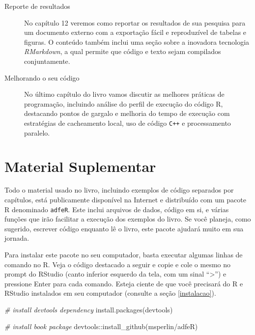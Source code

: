 \documentclass[
  11pt,
]{book}
\newenvironment{Shaded}{\begin{snugshade}}{\end{snugshade}}
\newcommand{\CommentTok}[1]{\textcolor[rgb]{0.37,0.37,0.37}{\textit{#1}}}
\newcommand{\FunctionTok}[1]{\textcolor[rgb]{0,0,0}{#1}}
\newcommand{\NormalTok}[1]{#1}
\newcommand{\SpecialCharTok}[1]{\textcolor[rgb]{0,0,0}{#1}}
\newcommand{\StringTok}[1]{\textcolor[rgb]{0.5,0.5,0.5}{#1}}
\begin{document}
\begin{description}
\item[Reporte de resultados]
No capítulo 12 veremos como reportar os resultados de sua pesquisa para um documento externo com a exportação fácil e reproduzível de tabelas e figuras. O conteúdo também inclui uma seção sobre a inovadora tecnologia \emph{RMarkdown}, a qual permite que código e texto sejam compilados conjuntamente.
\item[Melhorando o seu código]
No último capítulo do livro vamos discutir as melhores práticas de programação, incluindo análise do perfil de execução do código R, destacando pontos de gargalo e melhoria do tempo de execução com estratégias de cacheamento local, uso de código \texttt{C++} e processamento paralelo.
\end{description}

\hypertarget{material-suplementar}{%
\section*{Material Suplementar}\label{material-suplementar}}

Todo o material usado no livro, incluindo exemplos de código separados por capítulos, está publicamente disponível na Internet e distribuído com um pacote R denominado \texttt{adfeR}. Este inclui arquivos de dados, código em si, e várias funções que irão facilitar a execução dos exemplos do livro. Se você planeja, como sugerido, escrever código enquanto lê o livro, este pacote ajudará muito em sua jornada.

Para instalar este pacote no seu computador, basta executar algumas linhas de comando no R. Veja o código destacado a seguir e copie e cole o mesmo no prompt do RStudio (canto inferior esquerdo da tela, com um sinal ``\textgreater{}'') e pressione Enter para cada comando. Esteja ciente de que você precisará do R e RStudio instalados em seu computador (consulte a seção \ref{instalacao}).

\begin{Shaded}
\begin{Highlighting}[]
\CommentTok{\# install devtools dependency}
\FunctionTok{install.packages}\NormalTok{(}\StringTok{\textquotesingle{}devtools\textquotesingle{}}\NormalTok{)}

\CommentTok{\# install book package}
\NormalTok{devtools}\SpecialCharTok{::}\FunctionTok{install\_github}\NormalTok{(}\StringTok{\textquotesingle{}msperlin/adfeR\textquotesingle{}}\NormalTok{)}
\end{Highlighting}
\end{Shaded}
\end{document}
